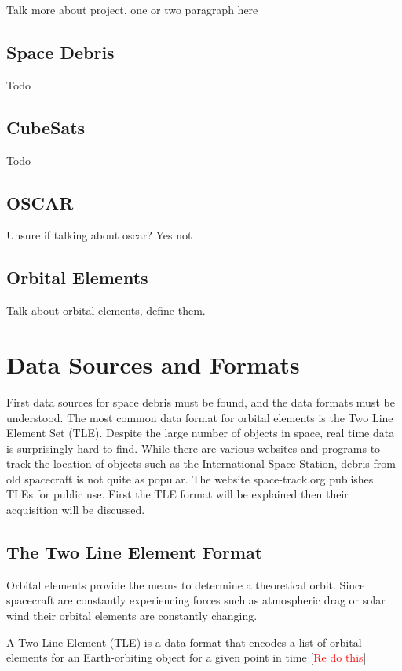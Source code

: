 \documentclass[12pt]{report}
\begin{document}
	Talk more about project. one or two paragraph here 

	\subsection{Space Debris}
	Todo
	\subsection{CubeSats}
	Todo
	
	\subsection{OSCAR}
	Unsure if talking about oscar? Yes not
	
	\subsection{Orbital Elements}
	Talk about orbital elements, define them.

	
	\newpage
	\section{Data Sources and Formats}
	
	
	
	First data sources for space debris must be found, and the data formats must be understood. The most common data format for orbital elements is the Two Line Element Set (TLE). Despite the large number of objects in space, real time data is surprisingly hard to find. While there are various websites and programs to track the location of objects such as the International Space Station, debris from old spacecraft is not quite as popular. The website space-track.org publishes TLEs for public use. First the TLE format will be explained then their acquisition will be discussed. 
	
	
	
	
	\subsection{The Two Line Element Format}
	
	Orbital elements provide the means to determine a theoretical orbit. Since spacecraft are constantly experiencing forces such as atmospheric drag or solar wind their orbital elements are constantly changing. \par 
	A Two Line Element (TLE) is a data format that encodes a list of orbital elements for an Earth-orbiting object for a given point in time [\textcolor{red}{Re do this}]\par
	
\end{document}

